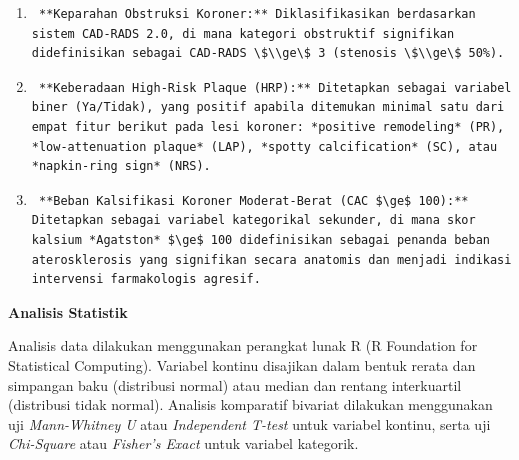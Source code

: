 \documentclass[
  indonesian,
]{agujournal2019}
\begin{document}
\begin{enumerate}
\def\labelenumi{\arabic{enumi}.}
\item
\begin{verbatim}
 **Keparahan Obstruksi Koroner:** Diklasifikasikan berdasarkan sistem CAD-RADS 2.0, di mana kategori obstruktif signifikan didefinisikan sebagai CAD-RADS \$\\ge\$ 3 (stenosis \$\\ge\$ 50%).
\end{verbatim}
\item
\begin{verbatim}
 **Keberadaan High-Risk Plaque (HRP):** Ditetapkan sebagai variabel biner (Ya/Tidak), yang positif apabila ditemukan minimal satu dari empat fitur berikut pada lesi koroner: *positive remodeling* (PR), *low-attenuation plaque* (LAP), *spotty calcification* (SC), atau *napkin-ring sign* (NRS).
\end{verbatim}
\item
\begin{verbatim}
 **Beban Kalsifikasi Koroner Moderat-Berat (CAC $\ge$ 100):** Ditetapkan sebagai variabel kategorikal sekunder, di mana skor kalsium *Agatston* $\ge$ 100 didefinisikan sebagai penanda beban aterosklerosis yang signifikan secara anatomis dan menjadi indikasi intervensi farmakologis agresif.
\end{verbatim}
\end{enumerate}

\textbf{Analisis Statistik}

Analisis data dilakukan menggunakan perangkat lunak R (R Foundation for
Statistical Computing). Variabel kontinu disajikan dalam bentuk rerata
dan simpangan baku (distribusi normal) atau median dan rentang
interkuartil (distribusi tidak normal). Analisis komparatif bivariat
dilakukan menggunakan uji \emph{Mann-Whitney U} atau \emph{Independent
T-test} untuk variabel kontinu, serta uji \emph{Chi-Square} atau
\emph{Fisher's Exact} untuk variabel kategorik.
\end{document}
